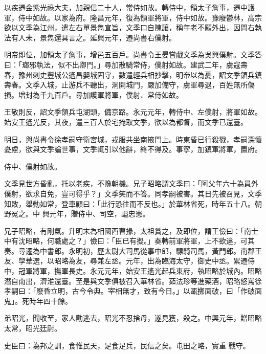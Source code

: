 \begin{pinyinscope}
 以疾遷金紫光祿大夫，加親信二十人，常侍如故。轉侍中，領太子詹事，遷中護軍，侍中如故。以家為府。隆昌元年，復為領軍將軍，侍中如故。豫廢鬱林，高宗欲以文季為江州，遣左右單景雋宣旨，文季口自陳讓，稱年老不願外出，因問右執法有人未，景雋還具言之。延興元年，遷尚書右僕射。



 明帝即位，加領太子詹事，增邑五百戶。尚書令王晏嘗戲文季為吳興僕射。文季答曰：「瑯邪執法，似不出卿門。」尋加散騎常侍，僕射如故。建武二年，虜寇壽
 春，豫州刺史豐城公遙昌嬰城固守，數遣輕兵相抄擊，明帝以為憂，詔文季領兵鎮壽春。文季入城，止游兵不聽出，洞開城門，嚴加備守，虜軍尋退，百姓無所傷損。增封為千九百戶。尋加護軍將軍，僕射、常侍如故。



 王敬則反，詔文季領兵屯湖頭，備京路。永元元年，轉侍中、左僕射，將軍如故。始安王遙光反，其夜，遣三百人於宅掩取文季，欲以為都督，而文季已還臺。



 明日，與尚書令徐孝嗣守衛宮城，戎服共坐南掖門上。時東昏已行殺戮，孝嗣深懷憂慮，欲與文季論世事，文季輒引以他辭，終不得及。事寧，加鎮軍將軍，置府。



 侍中、僕射如故。



 文季見世方昏亂，托以老疾，不豫朝機。兄子昭略謂文季曰：「阿父年六十為員外僕射，欲求自免，豈可得乎？」文季笑而不答。同孝嗣被害。其日先被召見，文季知敗，舉動如常，登車顧曰：「此行恐往而不反也。」於華林省死，時年五十八。朝野冤之。中
 興元年，贈侍中、司空，謚忠憲。



 兄子昭略，有剛氣。升明末為相國西曹掾，太祖賞之，及即位，謂王儉曰：「南士中有沈昭略，何職處之？」儉曰：「臣已有擬。」奏轉前軍將軍，上不欲違，可其奏。尋遷為中書郎。永明初，歷太尉大司馬從事中郎，驃騎司馬，黃門郎。南郡王友、學華選，以昭略為友，尋兼左丞。元年，出為臨海太守，御史中丞。累遷侍中，冠軍將軍，撫軍長史。永元元年，始安王遙光起兵東府，執昭略於城內。昭略潛自南出，濟淮還臺。至是與文季俱被召入華林省。茹法珍等進藥酒，昭略怒罵徐孝嗣曰：「廢昏立明，古今令典。宰相無才，致有今日。」以甌擲面破，曰「作破面鬼」。死時年四十餘。



 弟昭光，聞收至，家人勸逃去，昭光不忍捨母，遂見獲，殺之。中興元年，贈昭略太常，昭光廷尉。



 史臣曰：為邦之訓，食惟民天，足食足兵，民信之矣。屯田之略，實重
 戰守。




\end{pinyinscope}
